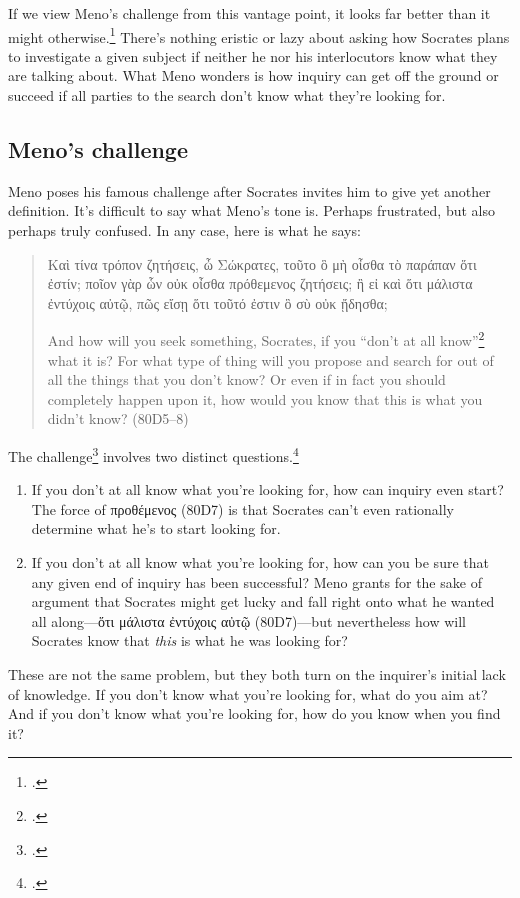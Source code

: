 If we view Meno's challenge from this vantage point, it looks far better than it might otherwise.\footcite[3 and 7]{nehamas1985} There's nothing eristic or lazy about asking how Socrates plans to investigate a given subject if neither he nor his interlocutors know what they are talking about. What Meno wonders is how inquiry can get off the ground or succeed if all parties to the search don't know what they're looking for.

\subsection{Meno's challenge}

Meno poses his famous challenge after Socrates invites him to give yet another definition. It's difficult to say what Meno's tone is. Perhaps frustrated, but also perhaps truly confused. In any case, here is what he says:

\begin{quote}
    {\g
    Καὶ τίνα τρόπον ζητήσεις, ὦ Σώκρατες, τοῦτο ὃ μὴ οἶσθα τὸ παράπαν ὅτι ἐστίν; ποῖον γὰρ ὧν οὐκ οἶσθα πρόθεμενος ζητήσεις; ἢ εἰ καὶ ὅτι μάλιστα ἐντύχοις αὐτῷ, πῶς εἴσῃ ὅτι τοῦτό ἐστιν ὃ σὺ οὐκ ᾔδησθα;
    }

    And how will you seek something, Socrates, if you ``don't at all know''\footcite[I've quoted this following Adam Beresford's translation in][because Meno appears to be throwing back at Socrates something that Socrates said at the start of the dialogue (71B1--8)]{protagorasmeno2005} what it is? For what type of thing will you propose and search for out of all the things that you don't know? Or even if in fact you should completely happen upon it, how would you know that this is what you didn't know? (80D5--8)
\end{quote}

The challenge\footcites[Most people call it a paradox, but for the reasons given by][I think it's better to call it something else.]{moline1969}[See, however,][25--27 for support of the term `paradox']{fine2014} involves two distinct questions.\footcite[][in Chapter 7, distinguishes between these as the problems of inquiry and discovery]{scott2006}

\begin{enumerate}
    \item If you don't at all know what you're looking for, how can inquiry even start? The force of {\g προθέμενος} (80D7) is that Socrates can't even rationally determine what he's to start looking for.
    \item If you don't at all know what you're looking for, how can you be sure that any given end of inquiry has been successful? Meno grants for the sake of argument that Socrates might get lucky and fall right onto what he wanted all along—{\g ὅτι μάλιστα ἐντύχοις αὐτῷ} (80D7)—but nevertheless how will Socrates know that \textit{this} is what he was looking for?
\end{enumerate}
These are not the same problem, but they both turn on the inquirer's initial lack of knowledge. If you don't know what you're looking for, what do you aim at? And if you don't know what you're looking for, how do you know when you find it?

